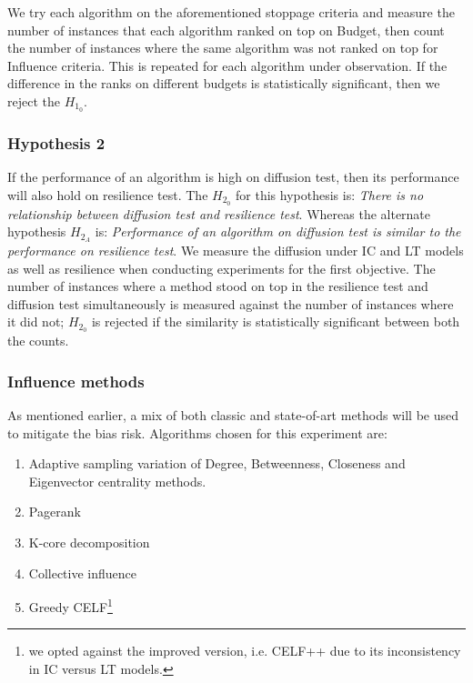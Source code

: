 			We try each algorithm on the aforementioned stoppage criteria and measure the number of instances that each algorithm ranked on top on Budget, then count the number of instances where the same algorithm was not ranked on top for Influence criteria. This is repeated for each algorithm under observation. If the difference in the ranks on different budgets is statistically significant, then we reject the $H_{1_0}$.
			
			\subsubsection{Hypothesis 2}
			If the performance of an algorithm is high on diffusion test, then its performance will also hold on resilience test. The $H_{2_0}$ for this hypothesis is: \textit{There is no relationship between diffusion test and resilience test}. Whereas the alternate hypothesis $H_{2_A}$ is: \textit{Performance of an algorithm on diffusion test is similar to the performance on resilience test}.
			We measure the diffusion under IC and LT models as well as resilience when conducting experiments for the first objective. The number of instances where a method stood on top in the resilience test and diffusion test simultaneously is measured against the number of instances where it did not; $H_{2_0}$ is rejected if the similarity is statistically significant between both the counts.
			
			\subsubsection{Influence methods}
			As mentioned earlier, a mix of both classic and state-of-art methods will be used to mitigate the bias risk. Algorithms chosen for this experiment are:
			
			\begin{enumerate}
				\item Adaptive sampling variation of Degree, Betweenness, Closeness and Eigenvector centrality methods.
				
				\item Pagerank
				
				\item K-core decomposition
				
				\item Collective influence
				
				\item Greedy CELF\footnote{we opted against the improved version, i.e. CELF++ due to its inconsistency in IC versus LT models\cite{arora2017}.}
			\end{enumerate}
			
